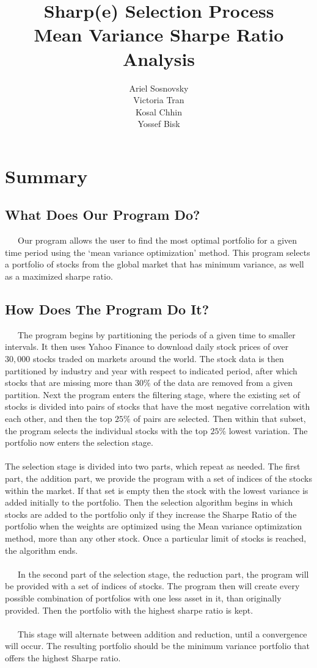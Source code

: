 \documentclass[12pt,titlepage,a4paper]{article}
\title{Sharp(e) Selection Process \\
	\large Mean Variance Sharpe Ratio Analysis}
\author{
	Ariel Sosnovsky\\
	Victoria Tran\\
	Kosal Chhin\\
	Yossef Bisk}
\begin{document}
\maketitle
\section{Summary}
\subsection{What Does Our Program Do?}
\ \ \ Our program allows the user to find the most optimal portfolio for a given time period using the ‘mean variance optimization’ method. This program selects a portfolio of stocks from the global market that has minimum variance, as well as a maximized sharpe ratio.

\subsection{How Does The Program Do It?}
\ \ \ The program begins by partitioning the periods of a given time to smaller intervals. It then uses Yahoo Finance to download daily stock prices of over $30,000$ stocks traded on markets around the world. The stock data is then partitioned by industry and year with respect to indicated period, after which stocks that are missing more than $30\%$ of the data are removed from a given partition. Next the program enters the filtering stage, where the existing set of stocks is divided into pairs of stocks that have the most negative correlation with each other, and then the top $25\%$ of pairs are selected. Then within that subset, the program selects the individual stocks with the top $25\%$ lowest variation. The portfolio now enters the selection stage. \\ \\
The selection stage is divided into two parts, which repeat as needed. The first part, the addition part, we provide the program with a set of indices of the stocks within the market. If that set is empty then the stock with the lowest variance is added initially to the portfolio. Then the selection algorithm begins in which stocks are added to the portfolio only if they increase the Sharpe Ratio of the portfolio when the weights are optimized using the Mean variance optimization method, more than any other stock. Once a particular limit of stocks is reached, the algorithm ends. \\ \\
\ \ \  In the second part of the selection stage, the reduction part, the program will be provided with a set of indices of stocks. The program then will create every possible combination of portfolios with one less asset in it, than originally provided. Then the portfolio with the highest sharpe ratio is kept.  \\ \\ 
\ \ \ This stage will alternate between addition and reduction, until a convergence will occur. The resulting portfolio should be the minimum variance portfolio that offers the highest Sharpe ratio. 
\end{document}
